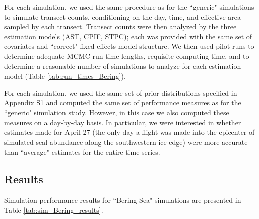 \documentclass[12pt,fleqn]{article}
\begin{document}
\begin{flushleft}
\hspace{.5in} For each simulation, we used the same procedure as for the ``generic" simulations to simulate transect counts, conditioning on the day, time, and effective area sampled by each transect.  Transect counts were then analyzed by the three estimation models (AST, CPIF, STPC); each was provided with the same set of covariates and ``correct" fixed effects model structure.  We then used pilot runs to determine adequate MCMC run time lengths, requisite computing time, and to determine a reasonable number of simulations to analyze for each estimation model (Table \ref{tab:run_times_Bering}).


\hspace{.5in} For each simulation, we used the same set of prior distributions specified in Appendix S1 and computed the same set of performance measures as for the ``generic" simulation study.  However, in this case we also computed these measures on a day-by-day basis.  In particular, we were interested in whether estimates made for April 27 (the only day a flight was made into the epicenter of simulated seal abundance along the southwestern ice edge) were more accurate than ``average" estimates for the entire time series.  


\subsection{Results}

Simulation performance results for ``Bering Sea" simulations are presented in Table
\ref{tab:sim_Bering_results}.


\renewcommand{\refname}{Literature Cited}




\pagebreak


\end{flushleft}
\end{document}
